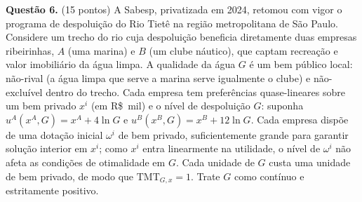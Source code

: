 
\textbf{Questão 6.} (15 pontos) A Sabesp, privatizada em 2024, retomou com vigor o programa de despolui\c{c}\~ao do Rio Tiet\^e na regi\~ao metropolitana de S\~ao Paulo. Considere um trecho do rio cuja despolui\c{c}\~ao beneficia diretamente duas empresas ribeirinhas, $A$ (uma marina) e $B$ (um clube n\'autico), que captam recrea\c{c}\~ao e valor imobili\'ario da \'agua limpa. A qualidade da \'agua $G$ \'e um bem p\'ublico local: n\~ao-rival (a \'agua limpa que serve a marina serve igualmente o clube) e n\~ao-exclu\'ivel dentro do trecho. Cada empresa tem prefer\^encias quase-lineares sobre um bem privado $x^i$ (em R\$~mil) e o n\'ivel de despolui\c{c}\~ao $G$: suponha $u^A(x^A,G)=x^A+4\ln G$ e $u^B(x^B,G)=x^B+12\ln G$. Cada empresa disp\~oe de uma dota\c{c}\~ao inicial $\omega^i$ de bem privado, suficientemente grande para garantir solu\c{c}\~ao interior em $x^i$; como $x^i$ entra linearmente na utilidade, o n\'ivel de $\omega^i$ n\~ao afeta as condi\c{c}\~oes de otimalidade em $G$. Cada unidade de $G$ custa uma unidade de bem privado, de modo que $\text{TMT}_{G,x}=1$. Trate $G$ como cont\'inuo e estritamente positivo.

